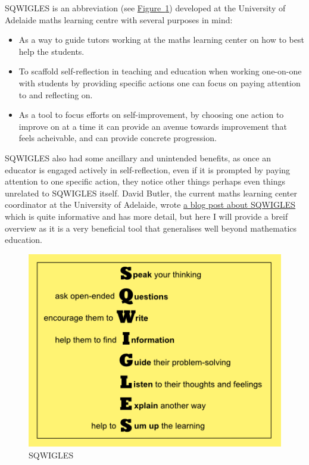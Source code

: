 \documentclass[twoside,12pt,a4paper]{report}
\newcommand{\reffig}[1]{\hyperref[fig:#1]{Figure~\ref{fig:#1}}}
\begin{document}
SQWIGLES is an abbreviation (see \reffig{sqwigles}) developed at the University of Adelaide maths learning centre with several purposes in mind:
\begin{itemize}
	\item As a way to guide tutors working at the maths learning center on how to best help the students.
	\item To scaffold self-reflection in teaching and education when working one-on-one with students by providing specific actions one can focus on paying attention to and reflecting on.
	\item As a tool to focus efforts on self-improvement, by choosing one action to improve on at a time it can provide an avenue towards improvement that feels acheivable, and can provide concrete progression.
\end{itemize}
SQWIGLES also had some ancillary and unintended benefits, as once an educator is engaged actively in self-reflection, even if it is prompted by paying attention to one specific action, they notice other things perhaps even things unrelated to SQWIGLES itself. David Butler, the current maths learning center coordinator at the University of Adelaide, wrote \href{https://blogs.adelaide.edu.au/maths-learning/2016/09/20/sqwigles/}{a blog post about SQWIGLES} which is quite informative and has more detail, but here I will provide a breif overview as it is a very beneficial tool that generalises well beyond mathematics education.

\begin{figure}[ht]
\centering
\includegraphics{./files/sqwigles.png}
\caption{SQWIGLES \label{fig:sqwigles}}
\end{figure}
\end{document}
